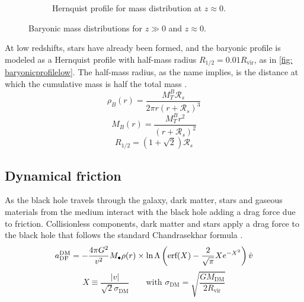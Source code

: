 \begin{figure}[h]
\begin{subfigure}[b]{0.49\textwidth}
					\caption{Hernquist profile for mass distribution at $z \approx 0$.}
						\label{fig: baryonicprofilelow}
				\end{subfigure}
				\caption{Baryonic mass distributions for $z \gg 0$ and $z \approx 0$.}
				\label{fig: baryonicprofile}
			\end{figure}

		At low redshifts, stars have already been formed, and the baryonic profile is modeled as a Hernquist profile with half-mass radius $R_{1/2} = 0.01 R_\text{vir}$, as in \autoref{fig: baryonicprofilelow}. The half-mass radius, as the name implies, is the distance at which the cumulative mass is half the total mass \cite{hernquist1990analytical}.
		\begin{equation}
			\rho_B(r) = \dfrac{M_T^B \mathcal{R}_s}{2\pi r(r + \mathcal{R}_s)^3}
		\end{equation}
		\begin{equation}
			M_B(r) = \dfrac{M_T^B r^2}{(r + \mathcal{R}_s)^2}
		\end{equation}
		\begin{equation}
			R_{1/2} = \left(1 + \sqrt{2}\right)\mathcal{R}_s
		\end{equation}
		
	\subsection{Dynamical friction}
		As the black hole travels through the galaxy, dark matter, stars and gaseous materials from the medium interact with the black hole adding a drag force due to friction. Collisionless components, dark matter and stars apply a drag force to the black hole that follows the standard Chandrasekhar formula \cite{choksi2017recoiling}.
		\begin{equation}
			a_\text{DF}^\text{DM} = - \dfrac{4\pi G^2}{v^2}M_\bullet\rho(r) \times \ln \Lambda\left(\text{erf}(X) - \dfrac{2}{\sqrt{\pi}}Xe^{-X^2}\right)\hat{v}
		\end{equation}
		\begin{equation}
			X \equiv \dfrac{|v|}{\sqrt{2}\sigma_\text{DM}} \qquad \text{with } \sigma_\text{DM} = \sqrt{\dfrac{GM_\text{DM}}{2R_\text{vir}}}
		\end{equation}
	
	
